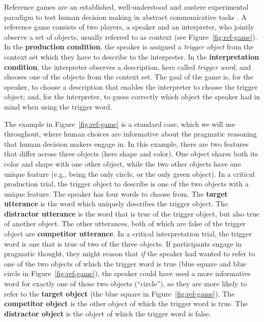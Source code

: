 \documentclass[fleqn]{article}
\begin{document}
Reference games are an established, well-understood and austere experimental paradigm to test human decision making in abstract communicative tasks \citep[e.g.,][]{FrankGoodman2012:Predicting-Prag,DegenFranke2013:Cost-Based-Prag,QingFranke2013:Variations-on-a,Frank2016:Rational-speech,SikosVenhuizen2021:Reevaluating-pr}.
A reference game consists of two players, a speaker and an interpreter, who jointly observe a set of objects, usually referred to as context (see Figure~\ref{fig:ref-game}).
In the \textbf{production condition}, the speaker is assigned a \emph{trigger object} from the context set which they have to describe to the interpreter.
In the \textbf{interpretation condition}, the interpreter observes a description, here called \emph{trigger word}, and chooses one of the objects from the context set.
The goal of the game is, for the speaker, to choose a description that enables the interpreter to choose the trigger object; and, for the interpreter, to guess correctly which object the speaker had in mind when using the trigger word.

The example in Figure~\ref{fig:ref-game} is a standard case, which we will use throughout, where human choices are informative about the pragmatic reasoning that human decision makers engage in.
In this example, there are two features that differ across three objects (here shape and color).
One object shares both its color and shape with one other object, while the two other objects have one unique feature (e.g., being the only circle, or the only green object).
%
In a critical production trial, the trigger object to describe is one of the two objects with a unique feature.
The speaker has four words to choose from.
The \textbf{target utterance} is the word which uniquely describes the trigger object.
The \textbf{distractor utterance} is the word that is true of the trigger object, but also true of another object.
The other utterances, both of which are false of the trigger object are \textbf{competitor utterance}.
%
In a critical interpretation trial, the trigger word is one that is true of two of the three objects.
If participants engage in pragmatic thought, they might reason that \emph{if} the speaker had wanted to refer to one of the two objects of which the trigger word is true (blue square and blue circle in Figure~\ref{fig:ref-game}), the speaker could have used a more informative word for exactly one of those two objects (``circle''), so they are more likely to refer to the \textbf{target object} (the blue square in Figure~\ref{fig:ref-game}).
The \textbf{competitor object} is the other object of which the trigger word is true.
The \textbf{distractor object} is the object of which the trigger word is false.
\end{document}
